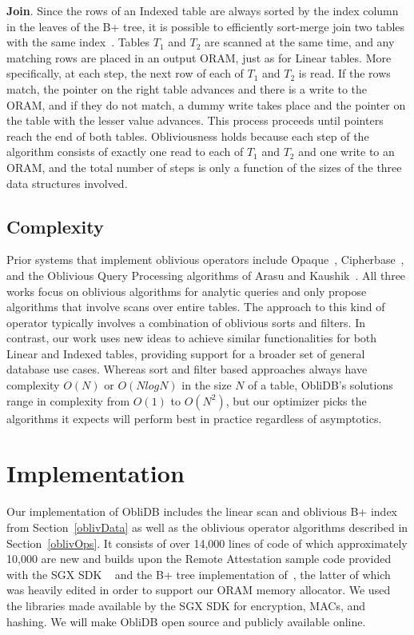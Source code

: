 \documentclass[letterpaper,twocolumn,10pt]{article}
\def\name/{ObliDB}
\begin{document}
  \noindent \textbf{Join}.
  Since the rows of an Indexed table are always sorted by the index column in the leaves of the B+ tree, it is possible to efficiently sort-merge join two tables with the same index~\cite{EN10}. Tables $T_1$ and $T_2$ are scanned at the same time, and any matching rows are placed in an output ORAM, just as for Linear tables. More specifically, at each step, the next row of each of $T_1$ and $T_2$ is read. If the rows match, the pointer on the right table advances and there is a write to the ORAM, and if they do not match, a dummy write takes place and the pointer on the table with the lesser value advances. This process proceeds until pointers reach the end of both tables. Obliviousness holds because each step of the algorithm consists of exactly one read to each of $T_1$ and $T_2$ and one write to an ORAM, and the total number of steps is only a function of the sizes of the three data structures involved.

\subsection{Complexity}
Prior systems that implement oblivious operators include Opaque~\cite{ZDB+17}, Cipherbase~\cite{cipherbase}, and the Oblivious Query Processing algorithms of Arasu and Kaushik~\cite{AK14}. All three works focus on oblivious algorithms for analytic queries and only propose algorithms that involve scans over entire tables. The approach to this kind of operator typically involves a combination of oblivious sorts and filters. In contrast, our work uses new ideas to achieve similar functionalities for both Linear and Indexed tables, providing support for a broader set of general database use cases. Whereas sort and filter based approaches always have complexity $O(N)$ or $O(N\textit{log}N)$ in the size $N$ of a table, \name/'s solutions range in complexity from $O(1)$ to $O(N^2)$, but our optimizer picks the algorithms it expects will perform best in practice regardless of asymptotics.

\section{Implementation}\label{imp}
Our implementation of \name/ includes the linear scan and oblivious B+ index from Section~\ref{oblivData} as well as the oblivious operator algorithms described in Section~\ref{oblivOps}. It consists of over 14,000 lines of code of which approximately 10,000 are new and builds upon the Remote Attestation sample code provided with the SGX SDK ~\cite{SGXRef} and the B+ tree implementation of~\cite{BPlus}, the latter of which was heavily edited in order to support our ORAM memory allocator. We used the libraries made available by the SGX SDK for encryption, MACs, and hashing. We will make \name/ open source and publicly available online.
\end{document}
